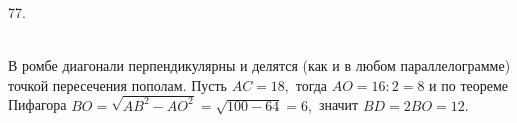 77. \begin{figure}[ht!]
\end{figure}\\
В ромбе диагонали перпендикулярны и делятся (как и в любом параллелограмме) точкой пересечения пополам. Пусть $AC=18,$ тогда $AO=16:2=8$ и по теореме Пифагора $BO=\sqrt{AB^2-AO^2}=\sqrt{100-64}=6,$ значит $BD=2BO=12.$\\
